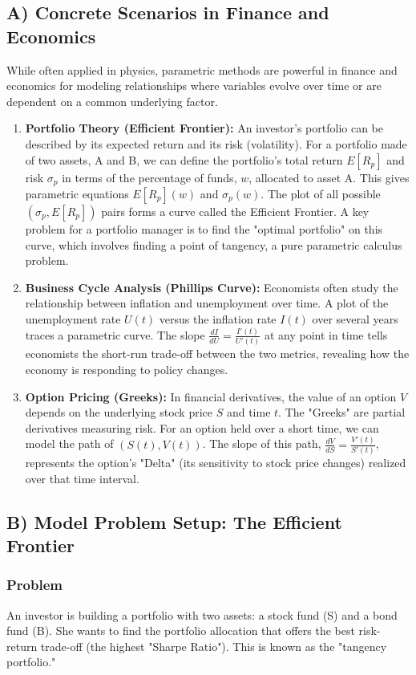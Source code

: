 \documentclass{article}
\begin{document}
\subsection{A) Concrete Scenarios in Finance and Economics}
While often applied in physics, parametric methods are powerful in finance and economics for modeling relationships where variables evolve over time or are dependent on a common underlying factor.

\begin{enumerate}
    \item \textbf{Portfolio Theory (Efficient Frontier):} An investor's portfolio can be described by its expected return and its risk (volatility). For a portfolio made of two assets, A and B, we can define the portfolio's total return $E[R_p]$ and risk $\sigma_p$ in terms of the percentage of funds, $w$, allocated to asset A. This gives parametric equations $E[R_p](w)$ and $\sigma_p(w)$. The plot of all possible $( \sigma_p, E[R_p] )$ pairs forms a curve called the Efficient Frontier. A key problem for a portfolio manager is to find the "optimal portfolio" on this curve, which involves finding a point of tangency, a pure parametric calculus problem.
    \item \textbf{Business Cycle Analysis (Phillips Curve):} Economists often study the relationship between inflation and unemployment over time. A plot of the unemployment rate $U(t)$ versus the inflation rate $I(t)$ over several years traces a parametric curve. The slope $\frac{dI}{dU} = \frac{I'(t)}{U'(t)}$ at any point in time tells economists the short-run trade-off between the two metrics, revealing how the economy is responding to policy changes.
    \item \textbf{Option Pricing (Greeks):} In financial derivatives, the value of an option $V$ depends on the underlying stock price $S$ and time $t$. The "Greeks" are partial derivatives measuring risk. For an option held over a short time, we can model the path of $(S(t), V(t))$. The slope of this path, $\frac{dV}{dS} = \frac{V'(t)}{S'(t)}$, represents the option's "Delta" (its sensitivity to stock price changes) realized over that time interval.
\end{enumerate}

\subsection{B) Model Problem Setup: The Efficient Frontier}

\subsubsection{Problem}
An investor is building a portfolio with two assets: a stock fund (S) and a bond fund (B). She wants to find the portfolio allocation that offers the best risk-return trade-off (the highest "Sharpe Ratio"). This is known as the "tangency portfolio."
\end{document}
